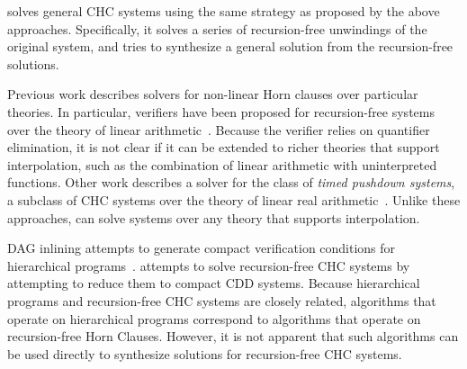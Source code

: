 \sys solves general CHC systems using the same strategy as proposed by
the above approaches.
%
Specifically, it solves a series of recursion-free unwindings of the
original system, and tries to synthesize a general solution from the
recursion-free solutions.

Previous work describes solvers for non-linear Horn clauses over
particular theories.
%
In particular, verifiers have been proposed for recursion-free systems
over the theory of linear arithmetic~\cite{komuravelli14}.
%
Because the verifier relies on quantifier elimination, it is not clear
if it can be extended to richer theories that support interpolation,
such as the combination of linear arithmetic with uninterpreted
functions.
%
Other work describes a solver for the class of \emph{timed pushdown
systems}, a subclass of CHC systems over the theory of linear real
arithmetic~\cite{hoder12}.
%
Unlike these approaches, \sys can solve systems over any theory that
supports interpolation.

DAG inlining attempts to generate compact verification conditions for
hierarchical programs~\cite{lal-qadeer15}.
%
\sys attempts to solve recursion-free CHC systems by attempting to
reduce them to compact CDD systems.
%
Because hierarchical programs and recursion-free CHC systems are
closely related, algorithms that operate on hierarchical programs
correspond to algorithms that operate on recursion-free Horn Clauses.
%
However, it is not apparent that such algorithms can be used directly
to synthesize solutions for recursion-free CHC systems.
